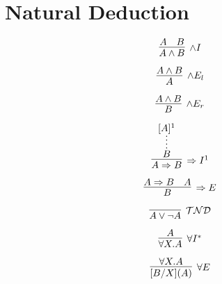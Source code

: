 \section{Natural Deduction}

\begin{multicols}{3}
    \noindent
    \begin{minipage}{\linewidth}   
        $$
            \infer[\land I]{A \land B}{A & B}
        $$
    \end{minipage}

    \noindent
    \begin{minipage}{\linewidth}   
        $$
            \infer[\land E_l]{A}{A \land B}
        $$
    \end{minipage}

    \noindent
    \begin{minipage}{\linewidth}   
        $$
            \infer[\land E_r]{B}{A \land B}
        $$
    \end{minipage}
\end{multicols}

\begin{multicols}{2}
    \noindent
    \begin{minipage}{\linewidth}
        $$
            \infer[\Rightarrow I^1]{A \Rightarrow B}{\infer*{B}{[A]^1}}
        $$
    \end{minipage}

    \noindent
    \begin{minipage}{\linewidth}
        \vspace*{1cm}
        $$
            \infer[\Rightarrow E]{B}{A \Rightarrow B \quad A}
        $$
    \end{minipage}
\end{multicols}

\noindent
\begin{minipage}{\linewidth}
    $$
        \infer[\mathcal{TND}]{A \lor \neg A}{\quad}
    $$
\end{minipage}

\begin{multicols}{2}
    \noindent
    \begin{minipage}{\linewidth}
        \[
            \infer[\forall I^*]{\forall X. A}{A}
        \]
    \end{minipage}

    \noindent
    \begin{minipage}{\linewidth}
        \[
            \infer[\forall E]{[B/X](A)}{\forall X.A}
        \]
    \end{minipage}
\end{multicols}


